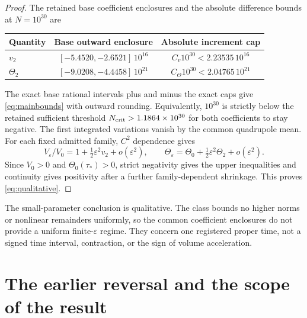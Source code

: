 \documentclass[11pt]{article}
\newcommand{\eps}{\varepsilon}
\begin{document}
\begin{proof}
The retained base coefficient enclosures and the absolute difference
bounds at $N=10^{30}$ are
\begin{center}
\begin{tabular}{@{}lcc@{}}\toprule
Quantity & Base outward enclosure & Absolute increment cap\\\midrule
$v_2$ & $[-5.4520,-2.6521]\,10^{16}$ & $C_v10^{30}<2.23535\,10^{16}$\\
$\Theta_2$ & $[-9.0208,-4.4458]\,10^{21}$ & $C_\Theta10^{30}<2.04765\,10^{21}$\\
\bottomrule
\end{tabular}
\end{center}
The exact base rational intervals plus and minus the exact caps give
\eqref{eq:mainbounds} with outward rounding. Equivalently, $10^{30}$
is strictly below the retained sufficient threshold
$N_{\rm crit}>1.1864\times10^{30}$ for both coefficients to stay negative.
The first integrated variations vanish by the common quadrupole mean.
For each fixed admitted family, $C^2$ dependence gives
\begin{equation}
 V_\eps/V_0=1+\tfrac12\eps^2v_2+o(\eps^2),\qquad
 \Theta_\eps=\Theta_0+\tfrac12\eps^2\Theta_2+o(\eps^2).
 \label{eq:taylor}
\end{equation}
Since $V_0>0$ and $\Theta_0(\tau_*)>0$, strict negativity gives the
upper inequalities and continuity gives positivity after a further
family-dependent shrinkage. This proves \eqref{eq:qualitative}.
\end{proof}

The small-parameter conclusion is qualitative. The class bounds no higher
norms or nonlinear remainders uniformly, so the common coefficient
enclosures do not provide a uniform finite-$\eps$ regime. They concern
one registered proper time, not a signed time interval, contraction, or
the sign of volume acceleration.

\section{The earlier reversal and the scope of the result}
\end{document}
